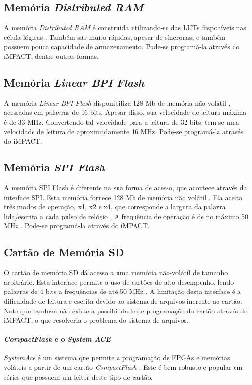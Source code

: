 \documentclass[11pt,a4paper,oneside]{book}
\begin{document}
\subsection{Memória \textit{Distributed RAM}}
A memória \textit{Distributed RAM} é construida utilizando-se das LUTs disponíveis nas célula lógicas \cite{ug473, wp377}.
Também são muito rápidas, apesar de síncronas, e também possuem pouca capacidade de armazenamento.
Pode-se programá-la através do iMPACT, dentre outras formas.

\subsection{Memória \textit{Linear BPI Flash}}
A memória \textit{Linear BPI Flash} disponibiliza 128 Mb de memória não-volátil \cite{ug810}, acessadas em palavras de 16 bits.
Apesar disso, sua velocidade de leitura máxima é de 33 MHz.
Convertendo tal velocidade para a leitura de 32 bits, tem-se uma velocidade de leitura de aproximadamente 16 MHz.
Pode-se programá-la através do iMPACT.

\subsection{Memória \textit{SPI Flash}}
A memória SPI Flash é diferente na sua forma de acesso, que acontece através da interface SPI.
Esta memória fornece 128 Mb de memória não volátil \cite{ug810}.
Ela aceita três modos de operação, x1, x2 e x4, que corresponde a largura da palavra lida/escrita a cada pulso de relógio \cite{N25Q128}.
A frequência de operação é de no máximo 50 MHz \cite{xapp586}.
Pode-se programá-la através do iMPACT.

\subsection{Cartão de Memória SD}
O cartão de memória SD dá acesso a uma memória não-volátil de tamanho arbitrário.
Esta interface permite o uso de cartões de alto desempenho, lendo palavras de 4 bits a frequências de até 50 MHz \cite{ug810}.
A limitação desta interface é a dificuldade de leitura e escrita devido ao sistema de arquivos inerente ao cartão.
Note que também não existe a possibilidade de programação do cartão através do iMPACT, o que resolveria o problema do sistema de arquivos.

\paragraph{\textit{CompactFlash} e o \textit{System ACE}}
\textit{SystemAce} é um sistema que permite a programação de FPGAs e memórias voláteis a partir de um cartão \textit{CompactFlash} \cite{ds080, ds583}.
Este é bem robusto e popular em séries que possuem um leitor deste tipo de cartão.
\end{document}

